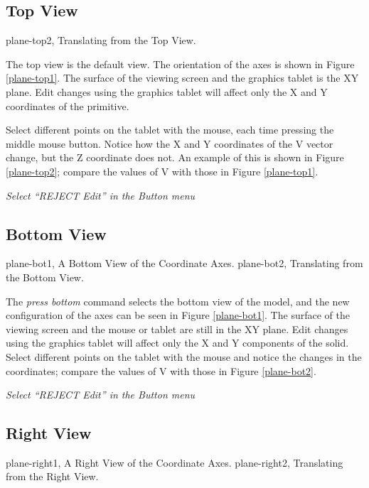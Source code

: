 \subsection{Top View}
\mfig plane-top2, Translating from the Top View.

The top view is the default view.  The orientation of the axes
is shown in Figure \ref{plane-top1}.
The surface of the viewing screen and the graphics tablet is the XY plane.
Edit changes using the graphics tablet will affect only the X and Y
coordinates of the primitive.


Select different points on the tablet with the mouse, each time
pressing the middle mouse button.
Notice how the X and Y coordinates of the V vector change,
but the Z coordinate does not.
An example of this is shown in Figure \ref{plane-top2};
compare the values of V with those in Figure \ref{plane-top1}.

{\em Select ``REJECT Edit'' in the Button menu}

\subsection{Bottom View}
\mfig plane-bot1, A Bottom View of the Coordinate Axes.
\mfig plane-bot2, Translating from the Bottom View.


The {\em press bottom} command selects the bottom view of the
model, and the new configuration of the axes can be seen in
Figure \ref{plane-bot1}.
The surface of the viewing screen and the mouse or tablet
are still in the XY plane.
Edit changes using the graphics tablet will affect only the X and Y
components of the solid.
Select different points on the tablet with the mouse and notice the
changes in the coordinates;
compare the values of V with those in Figure \ref{plane-bot2}.

{\em Select ``REJECT Edit'' in the Button menu}

\subsection{Right View}
\mfig plane-right1, A Right View of the Coordinate Axes.
\mfig plane-right2, Translating from the Right View.

